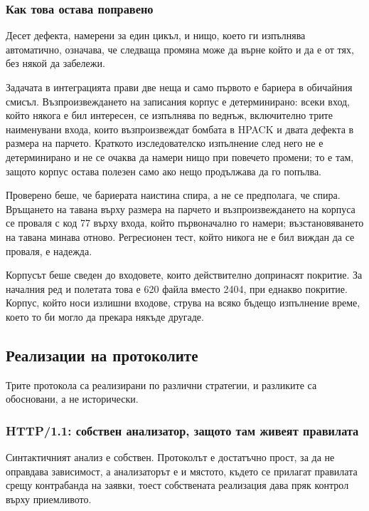 \subsubsection{Как това остава поправено}
\label{sec:fuzzgate}

Десет дефекта, намерени за един цикъл, и нищо, което ги изпълнява автоматично, означава, че
следваща промяна може да върне който и да е от тях, без някой да забележи.

Задачата в интеграцията прави две неща и само първото е бариера в обичайния смисъл.
Възпроизвеждането на записания корпус е детерминирано: всеки вход, който някога е бил
интересен, се изпълнява по веднъж, включително трите наименувани входа, които възпроизвеждат
бомбата в HPACK и двата дефекта в размера на парчето. Краткото изследователско изпълнение
след него не е детерминирано и не се очаква да намери нищо при повечето промени; то е там,
защото корпус остава полезен само ако нещо продължава да го попълва.

Проверено беше, че бариерата наистина спира, а не се предполага, че спира. Връщането на
тавана върху размера на парчето и възпроизвеждането на корпуса се проваля с код 77 върху
входа, който първоначално го намери; възстановяването на тавана минава отново. Регресионен
тест, който никога не е бил виждан да се проваля, е надежда.

Корпусът беше сведен до входовете, които действително допринасят покритие. За началния ред и
полетата това е 620 файла вместо 2404, при еднакво покритие. Корпус, който носи излишни
входове, струва на всяко бъдещо изпълнение време, което то би могло да прекара някъде другаде.

\subsection{Реализации на протоколите}

Трите протокола са реализирани по различни стратегии, и разликите са обосновани, а не
исторически.

\subsubsection{HTTP/1.1: собствен анализатор, защото там живеят правилата}

Синтактичният анализ е собствен. Протоколът е достатъчно прост, за да не оправдава
зависимост, а анализаторът е и мястото, където се прилагат правилата срещу контрабанда на
заявки, тоест собствената реализация дава пряк контрол върху приемливото.

